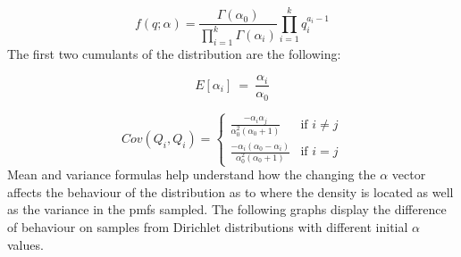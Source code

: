 \documentclass [twoside,hidelinks]{article}
\begin{document}
\begin{equation}
 f (q; \alpha) = \frac{ \Gamma ( \alpha_0)  }{ \prod_{i=1}^{k} \Gamma  ( \alpha_i) } \prod_{i=1}^{k} q_i^{a_i -1}
\end{equation}
The first two cumulants of the distribution are the following:

\begin{equation}
 E [ \alpha_i]\ =\ \frac{ \alpha_i }{ \alpha_0 } 
\end{equation}

\begin{equation}
 Cov (Q_i,Q_i) =
\left\{
	\begin{array}{ll}
		\frac{ - \alpha_i \alpha_j }{ \alpha_0^2  ( \alpha_0+1) }                   & \mbox{if } i \neq j  \\
		\frac{ - \alpha_i  ( \alpha_0 - \alpha_i) }{ \alpha_0^2  ( \alpha_0+1)} & \mbox{if } i=j
	\end{array}
\right.
\end{equation}
Mean and variance formulas help understand how the changing the $ \alpha $ vector affects the behaviour of the distribution as to where the density is located as well as the variance in the pmfs sampled. The following graphs display the difference of behaviour on samples from Dirichlet distributions with different initial $\alpha$ values.
\end{document}
